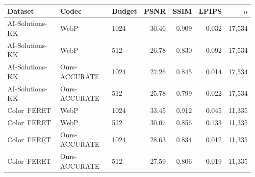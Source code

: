 \begin{tabular}{lllrrrr}
\toprule
Dataset & Codec & Budget & PSNR & SSIM & LPIPS & $n$ \\
\midrule
AI-Solutions-KK & WebP & 1024 & 30.46 & 0.909 & 0.032 & 17,534 \\
AI-Solutions-KK & WebP & 512 & 26.78 & 0.830 & 0.092 & 17,534 \\
AI-Solutions-KK & Ours-ACCURATE & 1024 & 27.26 & 0.845 & 0.014 & 17,534 \\
AI-Solutions-KK & Ours-ACCURATE & 512 & 25.78 & 0.799 & 0.022 & 17,534 \\
\midrule
Color~FERET & WebP & 1024 & 33.45 & 0.912 & 0.045 & 11,335 \\
Color~FERET & WebP & 512 & 30.07 & 0.856 & 0.133 & 11,335 \\
Color~FERET & Ours-ACCURATE & 1024 & 28.63 & 0.834 & 0.012 & 11,335 \\
Color~FERET & Ours-ACCURATE & 512 & 27.59 & 0.806 & 0.019 & 11,335 \\
\bottomrule
\end{tabular}

